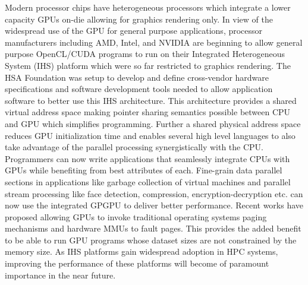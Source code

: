 \par Modern processor chips have heterogeneous processors which integrate a lower capacity GPUs on-die allowing for graphics rendering only. In view of the widespread use of the GPU for general purpose applications, processor manufacturers including AMD\cite{amd-apu}, Intel\cite{inteliris}, and NVIDIA\cite{denver} are beginning to allow general purpose OpenCL/CUDA programs to run on their Integrated Heterogeneous System (IHS) platform which were so far restricted to graphics rendering. The HSA Foundation \cite{hsafoundation} was setup to develop and define cross-vendor hardware specifications and software development tools needed to allow application software to better use this IHS architecture. This architecture provides a shared virtual address space making pointer sharing semantics possible between CPU and GPU which simplifies programming. Further a shared physical address space reduces GPU initialization time and enables several high level languages to also take advantage of the parallel processing synergistically with the CPU. Programmers can now write applications that seamlessly integrate CPUs with GPUs while benefiting from best attributes of each. Fine-grain data parallel sections in applications like garbage collection of virtual machines \cite{sumatra} and parallel stream processing like face detection, compression, encryption-decryption etc. can now use the integrated GPGPU to deliver better performance. Recent works have proposed allowing GPUs to invoke traditional operating systems paging mechanisms and hardware MMUs to fault pages. This provides the added benefit to be able to run GPU programs whose dataset sizes are not constrained by the memory size. As IHS platforms gain widespread adoption in HPC systems, improving the performance of these platforms will become of paramount importance in the near future. \cite{apu-exascale,amd-exascale1}
